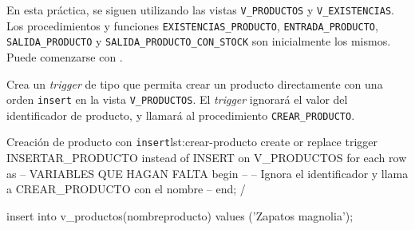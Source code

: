 En esta práctica, se siguen utilizando las vistas \texttt{V\_PRODUCTOS} y \texttt{V\_EXISTENCIAS}. Los procedimientos y funciones \texttt{EXISTENCIAS\_PRODUCTO}, \texttt{ENTRADA\_PRODUCTO}, \texttt{SALIDA\_PRODUCTO} y \texttt{SALIDA\_PRODUCTO\_CON\_STOCK} son inicialmente los mismos. Puede comenzarse con .


\begin{homeworkProblem}
  Crea un \textit{trigger} de tipo  que permita crear un producto directamente con una orden \texttt{insert} en la vista \texttt{V\_PRODUCTOS}. El \textit{trigger} ignorará el valor del identificador de producto, y llamará al procedimiento \texttt{CREAR\_PRODUCTO}.
  
  \begin{listadosql}{Creación de producto con \texttt{insert}}{lst:crear-producto}
create or replace trigger INSERTAR_PRODUCTO
instead of INSERT on V_PRODUCTOS
for each row
as 
  -- VARIABLES QUE HAGAN FALTA
begin
  -- 
  -- Ignora el identificador y llama a CREAR_PRODUCTO con el nombre
  -- 
end;
/


insert into v_productos(nombreproducto) values ('Zapatos magnolia');

\end{listadosql}

\end{homeworkProblem}

